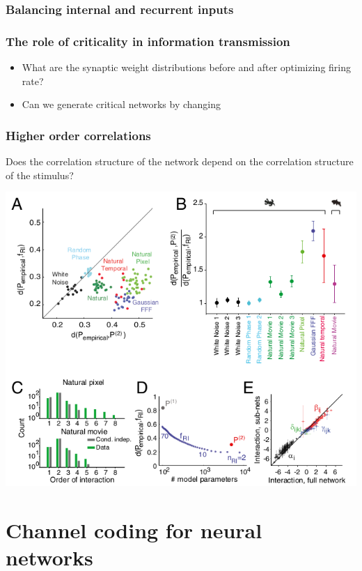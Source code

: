 \documentclass{beamer}
\begin{document}
\begin{frame}[plain]
\frametitle{Balancing internal and recurrent inputs} 



\end{frame}

\begin{frame}[plain]
\frametitle{The role of criticality in information transmission} 

\begin{itemize}
\item What are the synaptic weight distributions before and after optimizing firing rate?
\item Can we generate critical networks by changing 
\end{itemize}


\end{frame}

\begin{frame}[plain]
\frametitle{Higher order correlations} 

Does the correlation structure of the network depend on the correlation structure of the stimulus?

\begin{center}
\includegraphics[scale=0.35]{higher-order-interactions}
\end{center}


\end{frame}

\section{Channel coding for neural networks} 
\end{document}
